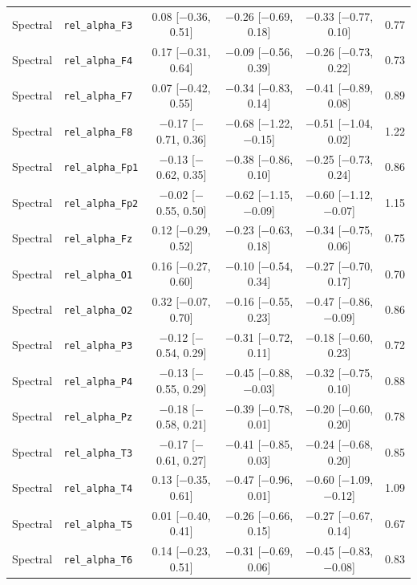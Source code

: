 {\begin{longtable}{llcccc}
Spectral & \texttt{rel\_alpha\_F3} & 0.08 [$-$0.36, 0.51] & $-$0.26 [$-$0.69, 0.18] & $-$0.33 [$-$0.77, 0.10] & 0.77 \\
Spectral & \texttt{rel\_alpha\_F4} & 0.17 [$-$0.31, 0.64] & $-$0.09 [$-$0.56, 0.39] & $-$0.26 [$-$0.73, 0.22] & 0.73 \\
Spectral & \texttt{rel\_alpha\_F7} & 0.07 [$-$0.42, 0.55] & $-$0.34 [$-$0.83, 0.14] & $-$0.41 [$-$0.89, 0.08] & 0.89 \\
Spectral & \texttt{rel\_alpha\_F8} & $-$0.17 [$-$0.71, 0.36] & $-$0.68 [$-$1.22, $-$0.15] & $-$0.51 [$-$1.04, 0.02] & 1.22 \\
Spectral & \texttt{rel\_alpha\_Fp1} & $-$0.13 [$-$0.62, 0.35] & $-$0.38 [$-$0.86, 0.10] & $-$0.25 [$-$0.73, 0.24] & 0.86 \\
Spectral & \texttt{rel\_alpha\_Fp2} & $-$0.02 [$-$0.55, 0.50] & $-$0.62 [$-$1.15, $-$0.09] & $-$0.60 [$-$1.12, $-$0.07] & 1.15 \\
Spectral & \texttt{rel\_alpha\_Fz} & 0.12 [$-$0.29, 0.52] & $-$0.23 [$-$0.63, 0.18] & $-$0.34 [$-$0.75, 0.06] & 0.75 \\
Spectral & \texttt{rel\_alpha\_O1} & 0.16 [$-$0.27, 0.60] & $-$0.10 [$-$0.54, 0.34] & $-$0.27 [$-$0.70, 0.17] & 0.70 \\
Spectral & \texttt{rel\_alpha\_O2} & 0.32 [$-$0.07, 0.70] & $-$0.16 [$-$0.55, 0.23] & $-$0.47 [$-$0.86, $-$0.09] & 0.86 \\
Spectral & \texttt{rel\_alpha\_P3} & $-$0.12 [$-$0.54, 0.29] & $-$0.31 [$-$0.72, 0.11] & $-$0.18 [$-$0.60, 0.23] & 0.72 \\
Spectral & \texttt{rel\_alpha\_P4} & $-$0.13 [$-$0.55, 0.29] & $-$0.45 [$-$0.88, $-$0.03] & $-$0.32 [$-$0.75, 0.10] & 0.88 \\
Spectral & \texttt{rel\_alpha\_Pz} & $-$0.18 [$-$0.58, 0.21] & $-$0.39 [$-$0.78, 0.01] & $-$0.20 [$-$0.60, 0.20] & 0.78 \\
Spectral & \texttt{rel\_alpha\_T3} & $-$0.17 [$-$0.61, 0.27] & $-$0.41 [$-$0.85, 0.03] & $-$0.24 [$-$0.68, 0.20] & 0.85 \\
Spectral & \texttt{rel\_alpha\_T4} & 0.13 [$-$0.35, 0.61] & $-$0.47 [$-$0.96, 0.01] & $-$0.60 [$-$1.09, $-$0.12] & 1.09 \\
Spectral & \texttt{rel\_alpha\_T5} & 0.01 [$-$0.40, 0.41] & $-$0.26 [$-$0.66, 0.15] & $-$0.27 [$-$0.67, 0.14] & 0.67 \\
Spectral & \texttt{rel\_alpha\_T6} & 0.14 [$-$0.23, 0.51] & $-$0.31 [$-$0.69, 0.06] & $-$0.45 [$-$0.83, $-$0.08] & 0.83 \\

\end{longtable}}
